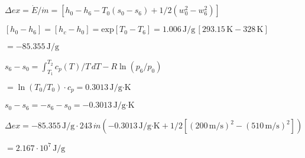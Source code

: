 \( \Delta ex = \dot{E}/\dot{m} = [h_0 - h_6 - T_0(s_0 - s_6) + 1/2(w_0^2 - w_6^2)] \)  

\( [h_0 - h_6] = [h_c - h_0] = \text{exp}[T_0 - T_6] = 1.006 \, \text{J/g} \, [293.15 \, \text{K} - 328 \, \text{K}] \)  

\( = -85.355 \, \text{J/g} \)  

\( s_6 - s_0 = \int_{T_1}^{T_2} c_p(T)/T \, dT - R \ln(p_6/p_0) \)  

\( = \ln(T_0/T_0) \cdot c_p = 0.3013 \, \text{J/g·K} \)  

\( s_0 - s_6 = -s_6 - s_0 = -0.3013 \, \text{J/g·K} \)  

\( \Delta ex = -85.355 \, \text{J/g} \cdot 243 \, \dot{m} (-0.3013 \, \text{J/g·K} + 1/2[(200 \, \text{m/s})^2 - (510 \, \text{m/s})^2]) \)  

\( = 2.167 \cdot 10^7 \, \text{J/g} \)
